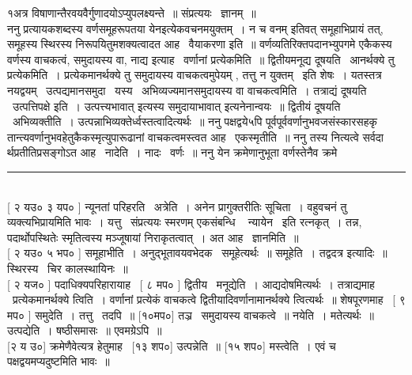 \documentclass[11pt, openany]{book}
\begin{document}
\begin{multicols}{2}
१अत्र विषाणान्तैरवयवैर्गुणादयोऽप्युपलक्ष्यन्ते~॥ संप्रत्ययः \textendash\ ज्ञानम्~॥\\

ननु प्रत्यायकशब्दस्य वर्णसमूहरूपतया {\qt येन}इत्येकवचनमयुक्तम्~। न च {\qt वनम्} इतिवत् समूहाभिप्रायं तत्, समूहस्य स्थिरस्य निरूपयितुमशक्यत्वादत आह \textendash\ वैयाकरणा इति~॥ वर्णव्यतिरिक्तपदानभ्युपगमे एकैकस्य वर्णस्य वाचकत्वं, समुदायस्य वा, नाद्य इत्याह \textendash\ वर्णानां प्रत्येकमिति~॥ द्वितीयमनूद्य दूषयति \textendash\ आनर्थक्ये तु प्रत्येकमिति~। प्रत्येकमानर्थक्ये तु समुदायस्य वाचकत्वमुपेयम् , तत्तु न युक्तम् \textendash\ इति शेषः~। यतस्तत्र नयद्वयम् \textendash\ उत्पद्यमानसमुदा \textendash\ यस्य \textendash\ अभिव्यज्यमानसमुदायस्य वा वाचकत्वमिति~।  तत्राद्यं दूषयति \textendash\ उत्पत्तिपक्षे इति~। {\qt उत्पत्त्यभावात्} इत्यस्य {\qt समुदायाभावात्} इत्यनेनान्वयः~॥ द्वितीयं दूषयति \textendash\ अभिव्यक्तीति~। उत्पन्नाभिव्यक्तेर्ध्वस्तत्वादित्यर्थः~॥ ननु पक्षद्वये५पि पूर्वपूर्ववर्णानुभवजसंस्कारसहकृ तान्त्यवर्णानुभवहेतुकैकस्मृत्युपारूढानां वाचकत्वमस्त्वत आह \textendash\ एकस्मृतीति~॥ ननु तस्य नित्यत्वे सर्वदा र्थप्रतीतिप्रसङ्गोऽत आह \textendash\ नादेति~। नादः \textendash\ वर्णः~॥ ननु येन क्रमेणानुभूता वर्णस्तेनैव क्रमे \textendash\ 

\noindent
\rule{1\linewidth}{0.5pt}\\

[ २ यउ० ३ यप० ] न्यूनतां परिहरति \textendash\ अत्रेति~। अनेन प्रागुक्तरीतिः सूचिता~। वहुवचनं तु व्यक्त्यभिप्रायमिति भावः~। यत्तु \textendash\ संप्रत्ययः स्मरणम् {\qt एकसंबन्धि \textendash\ } न्यायेन \textendash\ इति रत्नकृत्~। तन्न, पदार्थोपस्थितेः स्मृतित्वस्य मञ्जूषायां निराकृतत्वात्~। अत आह \textendash\ ज्ञानमिति~॥\\

[ २ यउ० ५ भप० ] समूहाभीति~। अनुद्भूतावयवभेदक \textendash\ समूहेत्यर्थः~॥ समूहेति~। {\qt तद्वदत्र} इत्यादिः~॥ स्थिरस्य \textendash\ चिर कालस्थायिनः~॥\\

[ २ यज० ] पदाधिक्यपरिहारायाह \textendash\ [ ८ मप० ] द्वितीय \textendash\ मनूद्येति~। आद्यदोषमित्यर्थः~। तत्राद्यमाह \textendash\ प्रत्येकमानर्थक्ये त्विति~। वर्णानां प्रत्येकं वाचकत्वे द्वितीयादिवर्णानामानर्थक्ये त्वित्यर्थः~॥ शेषपूरणमाह \textendash\ [ ९ मप० ] समुदेति~। तत्तु \textendash\ तदपि~॥ [१०मप०] तञ्र \textendash\ समुदायस्य वाचकत्वे~॥ नयेति~। मतेत्यर्थः~॥ उत्पद्येति~। षष्ठीसमासः~॥ एवमग्रेऽपि~॥\\

[२ य उ०] क्रमेणैवेत्यत्र हेतुमाह \textendash\ [१३ शप०] उत्पन्नेति~॥ [१५ शप०] मस्त्वेति~। एवं च पक्षद्वयमप्यदुष्टमिति भावः~॥\\


\end{multicols}
\end{document}
